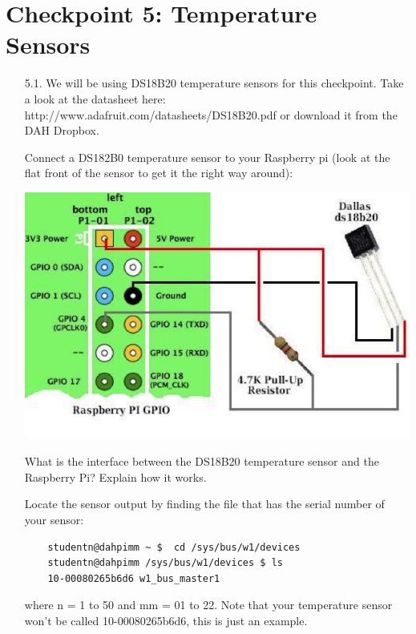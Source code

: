 \newpage
\section{Checkpoint 5: Temperature Sensors}

\begin{enumerate}

\item [5.1.] We will be using DS18B20 temperature sensors for this checkpoint. Take a look at the datasheet here: http://www.adafruit.com/datasheets/DS18B20.pdf  or download it from the DAH Dropbox.

Connect a DS182B0 temperature sensor to your Raspberry pi (look at the flat front of the sensor to get it the right way around):
\begin{center}
    \includegraphics[width=14cm]{figs/DS182B0}
\end{center}

What is the interface between the DS18B20 temperature sensor and the Raspberry Pi? Explain how it works. 

Locate the sensor output by finding the file that has the serial number of your sensor:
\begin{verbatim} 
    studentn@dahpimm ~ $  cd /sys/bus/w1/devices 
    studentn@dahpimm /sys/bus/w1/devices $ ls 
    10-00080265b6d6 w1_bus_master1 
\end{verbatim}
where n = 1 to 50 and mm = 01 to 22.
Note that your temperature sensor won't be called 10-00080265b6d6, this is just an example.


\end{enumerate}
